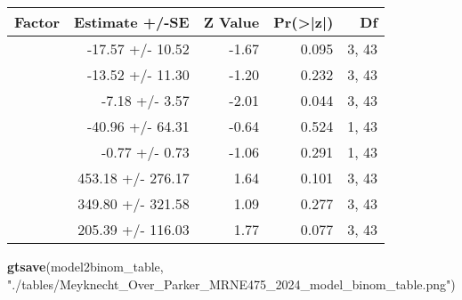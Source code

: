 \documentclass[
]{article}
\newenvironment{Shaded}{\begin{snugshade}}{\end{snugshade}}
\newcommand{\FunctionTok}[1]{\textcolor[rgb]{0.13,0.29,0.53}{\textbf{#1}}}
\newcommand{\NormalTok}[1]{#1}
\newcommand{\StringTok}[1]{\textcolor[rgb]{0.31,0.60,0.02}{#1}}
\begin{document}
\begin{table}[!t]
\fontsize{12.0pt}{14.4pt}\selectfont
\begin{tabular*}{\linewidth}{@{\extracolsep{\fill}}>{\raggedright\arraybackslash}p{\dimexpr 300.00pt -2\tabcolsep-1.5\arrayrulewidth}rrrr}
\toprule
Factor & Estimate +/-SE & Z Value & Pr(>|z|) & Df \\ 
\midrule\addlinespace[2.5pt]
{Treatment group 14 (˚C)} & {-17.57  +/-  10.52} & {-1.67} & {0.095} & {3, 43} \\ 
{Treatment group 16 (˚C)} & {-13.52  +/-  11.30} & {-1.20} & {0.232} & {3, 43} \\ 
{Treatment group 18 (˚C)} & {-7.18  +/-  3.57} & {-2.01} & {0.044} & {3, 43} \\ 
{Average length (m)} & {-40.96  +/-  64.31} & {-0.64} & {0.524} & {1, 43} \\ 
{Trial type predator} & {-0.77  +/-  0.73} & {-1.06} & {0.291} & {1, 43} \\ 
{Treatment group 14 (˚C) : Average length (m)} & {453.18  +/-  276.17} & {1.64} & {0.101} & {3, 43} \\ 
{Treatment group 16 (˚C) : Average length (m)} & {349.80  +/-  321.58} & {1.09} & {0.277} & {3, 43} \\ 
{Treatment group 18 (˚C) : Average length (m)} & {205.39  +/-  116.03} & {1.77} & {0.077} & {3, 43} \\ 
\bottomrule
\end{tabular*}
\end{table}

\begin{Shaded}
\begin{Highlighting}[]
\FunctionTok{gtsave}\NormalTok{(model2binom\_table, }\StringTok{"./tables/Meyknecht\_Over\_Parker\_MRNE475\_2024\_model\_binom\_table.png"}\NormalTok{)}
\end{Highlighting}
\end{Shaded}
\end{document}
